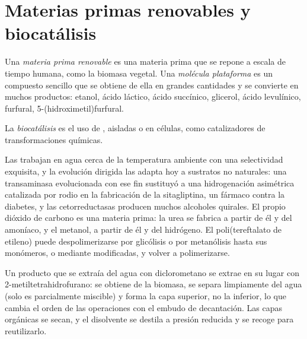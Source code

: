 \section{Materias primas renovables y biocatálisis}

\begin{definition}\label{def:b3:green-industrial:feedstock}
Una \emph{materia prima renovable} es una materia prima
que se repone a escala de tiempo humana, como la biomasa vegetal. Una \emph{molécula
plataforma} es un compuesto sencillo que se obtiene de ella en grandes
cantidades y se convierte en muchos productos: etanol, ácido láctico, ácido succínico,
glicerol, ácido levulínico, furfural, 5-(hidroximetil)furfural.
\end{definition}

\begin{definition}[Biocatálisis]\label{def:b3:green-industrial:biocatalysis}
La \emph{biocatálisis} es el uso de , aisladas o en
células, como catalizadores de transformaciones químicas.
\end{definition}

Las  trabajan en agua cerca de la temperatura ambiente con una selectividad exquisita, y la
evolución dirigida las adapta hoy a sustratos no naturales: una transaminasa
evolucionada con ese fin sustituyó a una hidrogenación asimétrica catalizada por rodio
en la fabricación de la sitagliptina, un fármaco contra la diabetes, y las cetorreductasas producen muchos
alcoholes quirales. El propio dióxido de carbono es una materia prima: la urea se fabrica a partir de él y del
amoníaco, y el metanol, a partir de él y del hidrógeno. El poli(tereftalato de etileno) puede
despolimerizarse por glicólisis o por metanólisis hasta sus monómeros, o mediante
 modificadas, y volver a polimerizarse.

\begin{inthelab}
Un producto que se extraía del agua con diclorometano se extrae
en su lugar con 2-metiltetrahidrofurano: se obtiene de la biomasa, se separa
limpiamente del agua (solo es parcialmente miscible) y forma la capa superior, no
la inferior, lo que cambia el orden de las operaciones con el embudo de decantación. Las
capas orgánicas se secan, y el disolvente se destila a presión reducida y se
recoge para reutilizarlo.
\end{inthelab}

